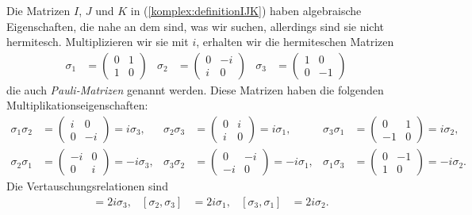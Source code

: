 Die Matrizen $I$, $J$ und $K$ in (\ref{komplex:definitionIJK}) haben
algebraische Eigenschaften, die nahe an dem sind, was wir suchen,
allerdings sind sie nicht hermitesch.
Multiplizieren wir sie mit $i$, erhalten wir die hermiteschen Matrizen
\begin{align}
\sigma_1
&=
\begin{pmatrix}
0&1\\1&0
\end{pmatrix}
&
\sigma_2
&=
\begin{pmatrix}
0&-i\\i&0
\end{pmatrix}
&
\sigma_3
&=
\begin{pmatrix}
1&0\\0&-1
\end{pmatrix}
\label{spin:paulimatrizen}
\end{align}
die auch {\em Pauli-Matrizen} genannt werden.
Diese Matrizen haben die folgenden Multiplikationseigenschaften:
\begin{align*}
\sigma_1\sigma_2
&=
\begin{pmatrix} i&0\\0&-i \end{pmatrix} = i\sigma_3,
&
\sigma_2\sigma_3
&=
\begin{pmatrix} 0&i\\i&0 \end{pmatrix} = i\sigma_1,
&
\sigma_3\sigma_1
&=
\begin{pmatrix} 0&1\\-1&0 \end{pmatrix} = i\sigma_2,
\\
\sigma_2\sigma_1
&=
\begin{pmatrix} -i&0\\0&i \end{pmatrix} = -i\sigma_3,
&
\sigma_3\sigma_2
&=
\begin{pmatrix} 0&-i\\-i&0 \end{pmatrix} = -i\sigma_1,
&
\sigma_1\sigma_3
&=
\begin{pmatrix} 0&-1\\1&0 \end{pmatrix} = -i\sigma_2.
\end{align*}
Die Vertauschungsrelationen sind
\begin{align*}
[\sigma_1,\sigma_2]
&=
2i\sigma_3,
&
[\sigma_2,\sigma_3]
&=
2i\sigma_1,
&
[\sigma_3,\sigma_1]
&=
2i\sigma_2.
\end{align*}
